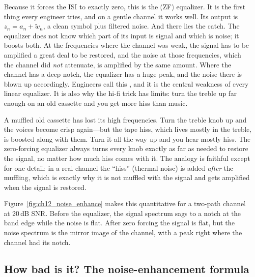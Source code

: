 Because it forces the ISI to exactly zero, this is the  (ZF) equalizer. It is the
first thing every engineer tries, and on a gentle channel it works well. Its output is
$z_n=a_n+\tilde w_n$, a clean symbol plus filtered noise. And there lies the catch. The equalizer
does not know which part of its input is signal and which is noise; it boosts both. At the
frequencies where the channel was weak, the signal has to be amplified a great deal to be restored,
and the noise at those frequencies, which the channel did \emph{not} attenuate, is amplified by the
same amount. Where the channel has a deep notch, the equalizer has a huge peak, and the noise
there is blown up accordingly. Engineers call this , and it is the central
weakness of every linear equalizer. It is also why the hi-fi trick has limits: turn the treble up
far enough on an old cassette and you get more hiss than music.

\begin{analogy}
A muffled old cassette has lost its high frequencies. Turn the treble knob up and the voices
become crisp again---but the tape hiss, which lives mostly in the treble, is boosted along with
them. Turn it all the way up and you hear mostly hiss. The zero-forcing equalizer always turns
every knob exactly as far as needed to restore the signal, no matter how much hiss comes with it.
The analogy is faithful except for one detail: in a real channel the ``hiss'' (thermal noise) is
added \emph{after} the muffling, which is exactly why it is not muffled with the signal and gets
amplified when the signal is restored.
\end{analogy}

Figure~\ref{fig:ch12_noise_enhance} makes this quantitative for a two-path channel at 20\,dB SNR.
Before the equalizer, the signal spectrum sags to a notch at the band edge while the noise is
flat. After zero forcing the signal is flat, but the noise spectrum is the mirror image of the
channel, with a peak right where the channel had its notch.


\subsection{How bad is it? The noise-enhancement formula}

